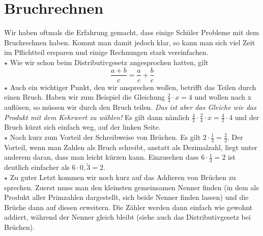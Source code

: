 \section{Bruchrechnen}
Wir haben oftmals die Erfahrung gemacht, dass einige Schüler Probleme mit dem Bruchrechnen haben. Kommt man damit jedoch klar, so kann man sich viel Zeit im Pflichtteil ersparen und einige Rechnungen stark vereinfachen. \\
\(\star\) Wie wir schon beim Distributivgesetz angesprochen hatten, gilt
\[\frac{a+b}{c}=\frac{a}{c}+\frac{b}{c}\]
\(\star\) Auch ein wichtiger Punkt, den wir ansprechen wollen, betrifft das Teilen durch einen Bruch. Haben wir zum Beispiel die Gleichung \(\frac{2}{4}\cdot x=4\) und wollen nach x auflösen, so müssen wir durch den Bruch teilen. \emph{Das ist aber das Gleiche wie das Produkt mit dem Kehrwert zu wählen!} Es gilt dann nämlich \(\frac{4}{2}\cdot \frac{2}{4}\cdot x=\frac{4}{2}\cdot 4\) und der Bruch kürzt sich einfach weg, auf der linken Seite.\\
\(\star\) Noch kurz zum Vorteil der Schreibweise von Brüchen. Es gilt \(2\cdot \frac{1}{3}=\frac{2}{3}\). Der Vorteil, wenn man Zahlen als Bruch schreibt, anstatt als Dezimalzahl, liegt unter anderem daran, dass man leicht kürzen kann. Einzusehen dass \(6\cdot \frac{1}{3}=2\) ist deutlich einfacher als \(6\cdot 0,\widetilde{3}=2\).\\
\(\star\) Zu guter Letzt kommen wir noch kurz auf das Addieren von Brüchen zu sprechen. Zuerst muss man den kleinsten gemeinsamen Nenner finden (in dem als Produkt aller Primzahlen dargestellt, sich beide Nenner finden lassen) und die Brüche dann auf diesen erweitern. Die Zähler werden dann einfach wie gewohnt addiert, während der Nenner gleich bleibt (siehe auch das Distributivgesetz bei Brüchen).
